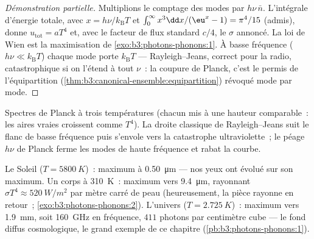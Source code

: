 \begin{proof}[Démonstration partielle]
Multiplions le comptage des modes par $h\nu\,\bar n$. L'intégrale
d'énergie totale, avec $x = h\nu/k_{\text{B}}T$ et $\int_0^\infty
x^3\dd x/(\eu^x - 1) = \pi^4/15$ (admis), donne $u_{\text{tot}}
= aT^4$ et, avec le facteur de flux standard $c/4$, le $\sigma$
annoncé. La loi de Wien est la maximisation de
\cref{exo:b3:photons-phonons:1}. À basse fréquence ($h\nu \ll
k_{\text{B}}T$) chaque mode porte $k_{\text{B}}T$ ---
Rayleigh--Jeans, correct pour la radio, catastrophique si on
l'étend à tout $\nu$~: la coupure de Planck, c'est le permis de
l'équipartition
(\cref{thm:b3:canonical-ensemble:equipartition}) révoqué mode par
mode.
\end{proof}

\begin{omfigure}

{\small Spectres de Planck à trois températures (chacun mis à une
hauteur comparable~: les aires vraies croissent comme $T^4$). La
droite classique de Rayleigh--Jeans suit le flanc de basse fréquence
puis s'envole vers la catastrophe ultraviolette~; le péage $h\nu$ de
Planck ferme les modes de haute fréquence et rabat la courbe.}
\end{omfigure}

\begin{example}\label{ex:b3:photons-phonons:thermometers}
Le Soleil ($T = \qty{5800}{K}$)~: maximum à \qty{0.50}{\micro m} ---
nos yeux ont évolué sur son maximum. Un corps à \qty{310}{K}~:
maximum vers \qty{9.4}{\micro m}, rayonnant $\sigma T^4 \approx
\qty{520}{W/m^2}$ par mètre carré de peau (heureusement, la pièce
rayonne en retour~;
\cref{exo:b3:photons-phonons:2}). L'univers ($T =
\qty{2.725}{K}$)~: maximum vers \qty{1.9}{mm}, soit \qty{160}{GHz} en
fréquence, $411$ photons par centimètre cube --- le fond diffus
cosmologique, le grand exemple de ce chapitre
(\cref{pb:b3:photons-phonons:1}).
\end{example}

